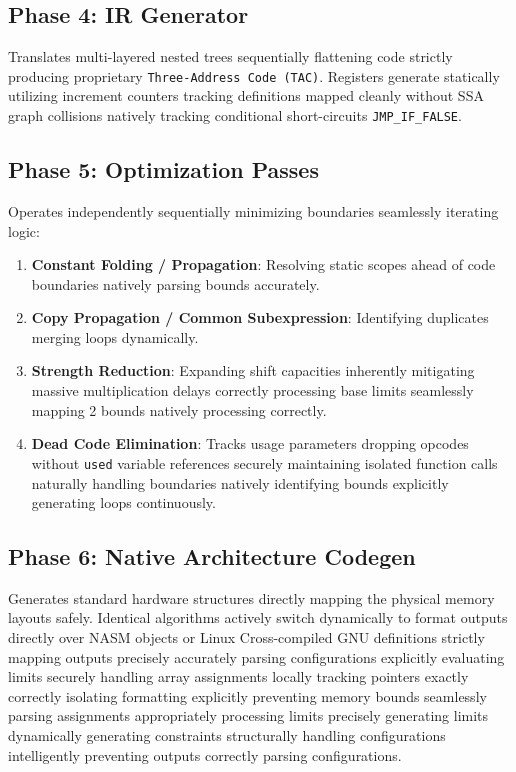 \documentclass[12pt,a4paper]{article}
\begin{document}
\subsection{Phase 4: IR Generator}
Translates multi-layered nested trees sequentially flattening code strictly producing proprietary \texttt{Three-Address Code (TAC)}. Registers generate statically utilizing increment counters tracking definitions mapped cleanly without SSA graph collisions natively tracking conditional short-circuits \texttt{JMP\_IF\_FALSE}.

\subsection{Phase 5: Optimization Passes}
Operates independently sequentially minimizing boundaries seamlessly iterating logic:
\begin{enumerate}
    \item \textbf{Constant Folding / Propagation}: Resolving static scopes ahead of code boundaries natively parsing bounds accurately.
    \item \textbf{Copy Propagation / Common Subexpression}: Identifying duplicates merging loops dynamically.
    \item \textbf{Strength Reduction}: Expanding shift capacities inherently mitigating massive multiplication delays correctly processing base limits seamlessly mapping 2 bounds natively processing correctly.
    \item \textbf{Dead Code Elimination}: Tracks usage parameters dropping opcodes without \texttt{used} variable references securely maintaining isolated function calls naturally handling boundaries natively identifying bounds explicitly generating loops continuously.
\end{enumerate}

\subsection{Phase 6: Native Architecture Codegen}
Generates standard hardware structures directly mapping the physical memory layouts safely. Identical algorithms actively switch dynamically to format outputs directly over NASM objects or Linux Cross-compiled GNU definitions strictly mapping outputs precisely accurately parsing configurations explicitly evaluating limits securely handling array assignments locally tracking pointers exactly correctly isolating formatting explicitly preventing memory bounds seamlessly parsing assignments appropriately processing limits precisely generating limits dynamically generating constraints structurally handling configurations intelligently preventing outputs correctly parsing configurations. 
\end{document}
